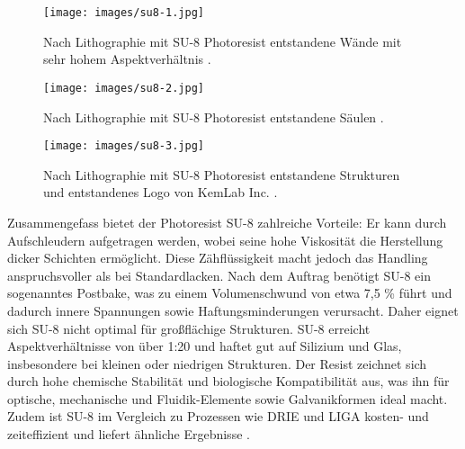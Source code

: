 \documentclass{article} %
\begin{document}
\begin{figure}[htb!]
    \centering
    \texttt{[image: images/su8-1.jpg]} %
    \captionsetup{labelfont=bf, width=.75\textwidth} %
    \caption{Nach Lithographie mit SU-8 Photoresist entstandene Wände mit sehr hohem Aspektverhältnis \cite{SU8Photoresist}.}
    \label{fig:su8-1}
\end{figure}

\begin{figure}[htb!]
    \centering
    \texttt{[image: images/su8-2.jpg]} %
    \captionsetup{labelfont=bf, width=.7\textwidth} %
    \caption{Nach Lithographie mit SU-8 Photoresist entstandene Säulen \cite{Tian2005}.}
    \label{fig:su8-2}
\end{figure}

\begin{figure}[htb!]
    \centering
    \texttt{[image: images/su8-3.jpg]} %
    \captionsetup{labelfont=bf, width=.85\textwidth} %
    \caption{Nach Lithographie mit SU-8 Photoresist entstandene Strukturen und entstandenes Logo von KemLab Inc. \cite{KemLab2023}.}
    \label{fig:su8-3}
\end{figure}

Zusammengefass bietet der Photoresist SU-8 zahlreiche Vorteile: Er kann durch Aufschleudern aufgetragen werden, wobei seine hohe Viskosität die Herstellung dicker Schichten ermöglicht. Diese Zähflüssigkeit macht jedoch das Handling anspruchsvoller als bei Standardlacken. Nach dem Auftrag benötigt SU-8 ein sogenanntes Postbake, was zu einem Volumenschwund von etwa 7,5 \% führt und dadurch innere Spannungen sowie Haftungsminderungen verursacht. Daher eignet sich SU-8 nicht optimal für großflächige Strukturen. SU-8 erreicht Aspektverhältnisse von über 1:20 und haftet gut auf Silizium und Glas, insbesondere bei kleinen oder niedrigen Strukturen. Der Resist zeichnet sich durch hohe chemische Stabilität und biologische Kompatibilität aus, was ihn für optische, mechanische und Fluidik-Elemente sowie Galvanikformen ideal macht. Zudem ist SU-8 im Vergleich zu Prozessen wie DRIE und LIGA kosten- und zeiteffizient und liefert ähnliche Ergebnisse \cite{schmid2024, Kayaku2020}.



\end{document}
